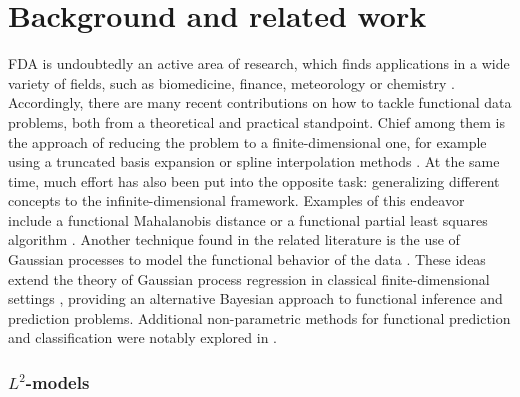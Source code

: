 %
%

\let\epsilon\varepsilon

\chapter{Background and related work}\label{ch:background}

FDA is undoubtedly an active area of research, which finds applications in a wide variety of fields, such as biomedicine, finance, meteorology or chemistry \citep[see for example][]{ullah2013applications}. Accordingly, there are many recent contributions on how to tackle functional data problems, both from a theoretical and practical standpoint. Chief among them is the approach of reducing the problem to a finite-dimensional one, for example using a truncated basis expansion or spline interpolation methods \citep[e.g.][]{muller2005generalized, aguilera2013comparative}. At the same time, much effort has also been put into the opposite task: generalizing different concepts to the infinite-dimensional framework. Examples of this endeavor include a functional Mahalanobis distance \citep{berrendero2020mahalanobis} or a functional partial least squares algorithm \citep{delaigle2012methodology}. Another technique found in the related literature is the use of Gaussian processes to model the functional behavior of the data \citep[see for instance][]{shi2011gaussian}. These ideas extend the theory of Gaussian process regression in classical finite-dimensional settings \citep[e.g.][]{rasmussen2004gaussian}, providing an alternative Bayesian approach to functional inference and prediction problems. Additional non-parametric methods for functional prediction and classification were notably explored in \citet{ferraty2006nonparametric}.

\subsection*{\(L^2\)-models}

